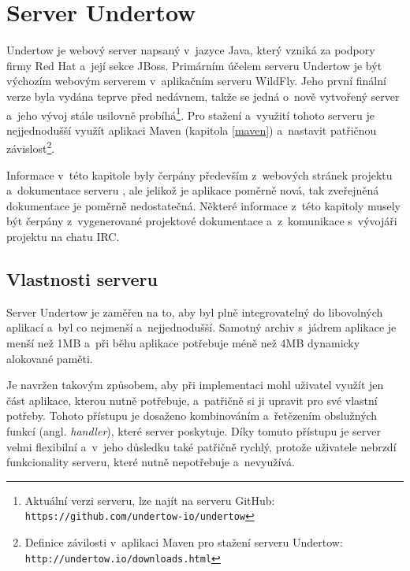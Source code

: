     \section{Server Undertow} \label{undertow}
        Undertow je webový server napsaný v~jazyce Java, 
        který vzniká za podpory firmy Red Hat a~její sekce JBoss.
        Primárním účelem serveru Undertow je být výchozím webovým serverem v~aplikačním serveru WildFly.
        Jeho první finální verze byla vydána teprve před nedávnem, takže se jedná
        o~nově vytvořený server a~jeho vývoj stále usilovně 
        probíhá\footnote{Aktuální verzi serveru, lze najít na serveru GitHub: 
        \texttt{https://github.com/undertow-io/undertow}}. Pro stažení a~využití tohoto serveru
        je nejjednodušší využít aplikaci Maven (kapitola \ref{maven}) a~nastavit patřičnou 
        závislost\footnote{Definice závilosti v~aplikaci Maven pro stažení serveru Undertow: 
        \texttt{http://undertow.io/downloads.html} }.

        Informace v~této kapitole byly čerpány především z~webových stránek projektu \cite{undertowWeb}
        a~dokumentace serveru \cite{undertowDocs},
        ale jelikož je aplikace poměrně nová, tak zveřejněná dokumentace je poměrně nedostatečná. 
        Některé informace z~této kapitoly musely být čerpány
        z~vygenerované projektové dokumentace a~z~komunikace s~vývojáři projektu
        na chatu IRC.

        \subsection{Vlastnosti serveru}
            Server Undertow je zaměřen na to, aby byl plně integrovatelný do libovolných aplikací
            a~byl co nejmenší a~nejjednodušší. Samotný
            archiv s~jádrem aplikace je menší než 1MB a~při běhu aplikace potřebuje
            méně než 4MB dynamicky alokované paměti. 

            Je navržen takovým způsobem, aby při implementaci mohl uživatel využít
            jen část aplikace, kterou nutně potřebuje, a~patřičně si ji upravit
            pro své vlastní potřeby.
            Tohoto přístupu je dosaženo kombinováním a~řetězením
            obslužných funkcí (angl. \emph{handler}), které server poskytuje.
            Díky tomuto přístupu je server velmi flexibilní a~v~jeho důsledku
            také patřičně rychlý, protože uživatele nebrzdí funkcionality
            serveru, které nutně nepotřebuje a~nevyužívá.
            
